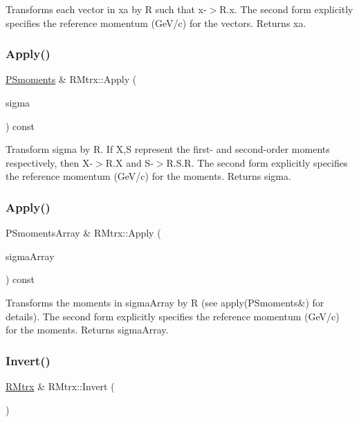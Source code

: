 Transforms each vector in xa by R such that x-\/$>$R.\+x. The second form explicitly specifies the reference momentum (Ge\+V/c) for the vectors. Returns xa. \mbox{\label{classRMtrx_a563c6861facf2b7147575ab0921357d8}} 
\subsubsection{\texorpdfstring{Apply()}{Apply()}\hspace{0.1cm}{\footnotesize\ttfamily [3/4]}}
{\footnotesize\ttfamily \hyperlink{classTPSMoments}{P\+Smoments} \& R\+Mtrx\+::\+Apply (\begin{DoxyParamCaption}\item[{\hyperlink{classTPSMoments}{P\+Smoments} \&}]{sigma }\end{DoxyParamCaption}) const}

Transform sigma by R. If X,S represent the first-\/ and second-\/order moments respectively, then X-\/$>$R.\+X and S-\/$>$R.\+S.\+R\textquotesingle{}. The second form explicitly specifies the reference momentum (Ge\+V/c) for the moments. Returns sigma. \mbox{\label{classRMtrx_a3d1ab14e965dbadccf16040a28cb6911}} 
\subsubsection{\texorpdfstring{Apply()}{Apply()}\hspace{0.1cm}{\footnotesize\ttfamily [4/4]}}
{\footnotesize\ttfamily P\+Smoments\+Array \& R\+Mtrx\+::\+Apply (\begin{DoxyParamCaption}\item[{P\+Smoments\+Array \&}]{sigma\+Array }\end{DoxyParamCaption}) const}

Transforms the moments in sigma\+Array by R (see apply(\+P\+Smoments\&) for details). The second form explicitly specifies the reference momentum (Ge\+V/c) for the moments. Returns sigma\+Array. \mbox{\label{classRMtrx_aec48b145bf3d175a14026d04fe3eb23c}} 
\subsubsection{\texorpdfstring{Invert()}{Invert()}}
{\footnotesize\ttfamily \hyperlink{classRMtrx}{R\+Mtrx} \& R\+Mtrx\+::\+Invert (\begin{DoxyParamCaption}{ }\end{DoxyParamCaption})}

